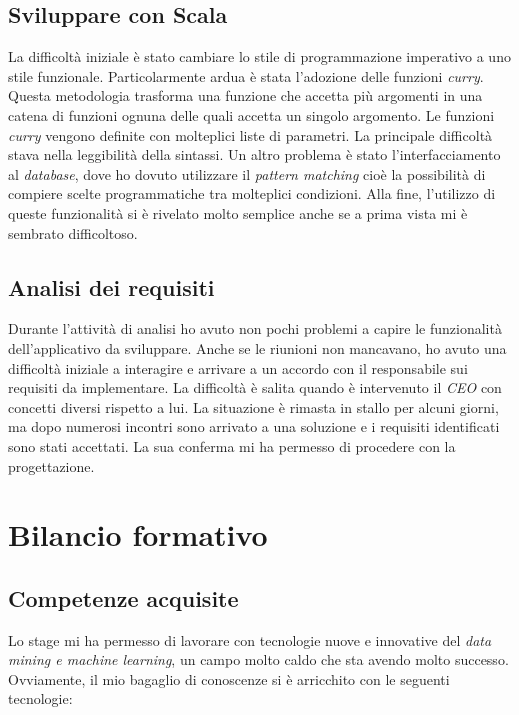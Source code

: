 \subsection*{Sviluppare con Scala}
La difficoltà iniziale è stato cambiare lo stile di programmazione imperativo a uno stile funzionale.
Particolarmente ardua è stata l'adozione delle funzioni \textit{curry}. Questa metodologia trasforma una funzione che accetta più argomenti in una catena di funzioni ognuna delle quali accetta un singolo argomento. Le funzioni \textit{curry} vengono definite con molteplici liste di parametri. La principale difficoltà stava nella leggibilità della sintassi. Un altro problema è stato l'interfacciamento al \textit{database}, dove ho dovuto utilizzare il \textit{pattern matching} cioè la possibilità di compiere scelte programmatiche tra molteplici condizioni. Alla fine, l'utilizzo di queste funzionalità si è rivelato molto semplice anche se a prima vista mi è sembrato difficoltoso.

\subsection*{Analisi dei requisiti}
Durante l'attività di analisi ho avuto non pochi problemi a capire le funzionalità dell'applicativo da sviluppare. Anche se le riunioni non mancavano, ho avuto una difficoltà iniziale a interagire e arrivare a un accordo con il responsabile sui requisiti da implementare. La difficoltà è salita quando è intervenuto il \textit{CEO} con concetti diversi rispetto a lui. La situazione è rimasta in stallo per alcuni giorni, ma dopo numerosi incontri sono arrivato a una soluzione e i requisiti identificati sono stati accettati. La sua conferma mi ha permesso di procedere con la progettazione.




\section{Bilancio formativo}

\subsection{Competenze acquisite}
Lo stage mi ha permesso di lavorare con tecnologie nuove e innovative del \textit{data mining e machine learning}, un campo molto caldo che sta avendo molto successo. Ovviamente, il mio bagaglio di conoscenze si è arricchito con le seguenti tecnologie:

